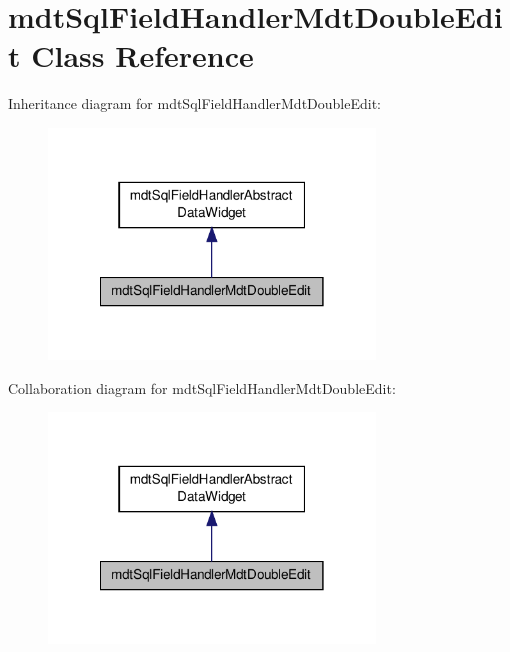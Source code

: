 \hypertarget{classmdt_sql_field_handler_mdt_double_edit}{\section{mdt\-Sql\-Field\-Handler\-Mdt\-Double\-Edit Class Reference}
\label{classmdt_sql_field_handler_mdt_double_edit}
}


Inheritance diagram for mdt\-Sql\-Field\-Handler\-Mdt\-Double\-Edit\-:\nopagebreak
\begin{figure}[H]
\begin{center}
\leavevmode
\includegraphics[width=246pt]{classmdt_sql_field_handler_mdt_double_edit__inherit__graph}
\end{center}
\end{figure}


Collaboration diagram for mdt\-Sql\-Field\-Handler\-Mdt\-Double\-Edit\-:\nopagebreak
\begin{figure}[H]
\begin{center}
\leavevmode
\includegraphics[width=246pt]{classmdt_sql_field_handler_mdt_double_edit__coll__graph}
\end{center}
\end{figure}
